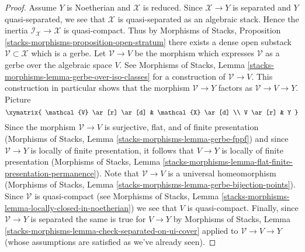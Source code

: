 \begin{proof}
\medskip\noindent
Assume $Y$ is Noetherian and $\mathcal{X}$ is reduced.
Since $\mathcal{X} \to Y$ is separated and $Y$ quasi-separated,
we see that $\mathcal{X}$ is quasi-separated as an algebraic stack.
Hence the inertia $\mathcal{I}_\mathcal{X} \to \mathcal{X}$
is quasi-compact. Thus by Morphisms of Stacks, Proposition
\ref{stacks-morphisms-proposition-open-stratum}
there exists a dense open substack $\mathcal{V} \subset \mathcal{X}$
which is a gerbe. Let $\mathcal{V} \to V$ be the morphism
which expresses $\mathcal{V}$ as a gerbe over the algebraic space $V$.
See
Morphisms of Stacks, Lemma \ref{stacks-morphisms-lemma-gerbe-over-iso-classes}
for a construction of $\mathcal{V} \to V$.
This construction in particular shows that the morphism
$\mathcal{V} \to Y$ factors as $\mathcal{V} \to V \to Y$.
Picture
$$
\xymatrix{
\mathcal{V} \ar[r] \ar[d] & \mathcal{X} \ar[d] \\
V \ar[r] & Y
}
$$
Since the morphism $\mathcal{V} \to V$ is surjective, flat, and
of finite presentation
(Morphisms of Stacks, Lemma \ref{stacks-morphisms-lemma-gerbe-fppf})
and since $\mathcal{V} \to Y$ is locally of finite presentation,
it follows that $V \to Y$ is locally of finite presentation
(Morphisms of Stacks, Lemma
\ref{stacks-morphisms-lemma-flat-finite-presentation-permanence}).
Note that $\mathcal{V} \to V$ is a universal homeomorphism
(Morphisms of Stacks, Lemma
\ref{stacks-morphisms-lemma-gerbe-bijection-points}).
Since $\mathcal{V}$ is quasi-compact (see
Morphisms of Stacks, Lemma
\ref{stacks-morphisms-lemma-locally-closed-in-noetherian})
we see that $V$ is quasi-compact.
Finally, since $\mathcal{V} \to Y$ is separated the same is true
for $V \to Y$ by
Morphisms of Stacks, Lemma
\ref{stacks-morphisms-lemma-check-separated-on-ui-cover}
applied to $\mathcal{V} \to V \to Y$
(whose assumptions are satisfied as we've already seen).


\end{proof}
